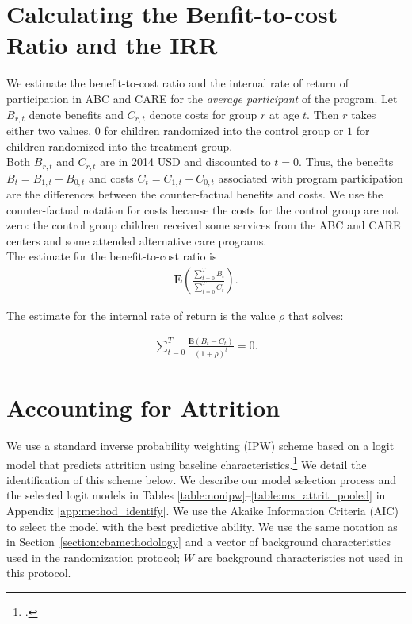 \begin{appendices}
\section{Calculating the Benfit-to-cost Ratio and the IRR}

\noindent We estimate the benefit-to-cost ratio and the  internal rate of return of participation in ABC and CARE for the \textit{average participant} of the program. Let $B_{r,t}$ denote benefits and  $C_{r,t}$ denote costs for group $r$ at age $t$. Then $r$ takes either two values, $0$ for children randomized into the control group or $1$ for children randomized into the treatment group.\\

\noindent Both $B_{r,t}$ and $C_{r,t}$ are in 2014 USD and discounted to $t = 0$. Thus, the benefits $B_t = B_{1,t} - B_{0,t}$ and costs $C_t = C_{1,t} - C_{0,t}$ associated with program participation are the differences between the counter-factual benefits and costs. We use the counter-factual notation for costs because the costs for the control group are not zero: the control group children received some services from the ABC and CARE centers and some attended alternative care programs. \\

\noindent The estimate for the benefit-to-cost ratio is
\begin{align}
\mathbf{E} \left( \frac{ \sum_{t=0}^T B_t}{\sum_{t=0}^T C_t} \right).
\end{align}

\noindent The estimate for the internal rate of return is the value $\rho$ that solves:

\begin{align}
\sum_{t=0}^T \frac{ \mathbf{E} (B_t - C_t)}{(1+\rho)^t} = 0.
\end{align}

\setcounter{figure}{0}  \renewcommand{\thefigure}{G.\arabic{figure}}
\setcounter{table}{0}   \renewcommand{\thetable}{G.\arabic{table}}

\section{Accounting for Attrition} \label{appendix:attrition}

\noindent We use a standard inverse probability weighting (IPW) scheme based on a logit model that predicts attrition using baseline characteristics.\footnote{\citet{Horvitz_Thompson_1952_JASA}.} We detail the identification of this scheme below. We describe our model selection process and the selected logit models in Tables \ref{table:nonipw}--\ref{table:ms_attrit_pooled} in Appendix \ref{app:method_identify}. We use the Akaike Information Criteria (AIC) to select the model with the best predictive ability. We use the same notation as in Section~\ref{section:cbamethodology} and a vector of background characteristics used in the randomization protocol; $W$ are background characteristics not used in this protocol.\\


\end{appendices}
